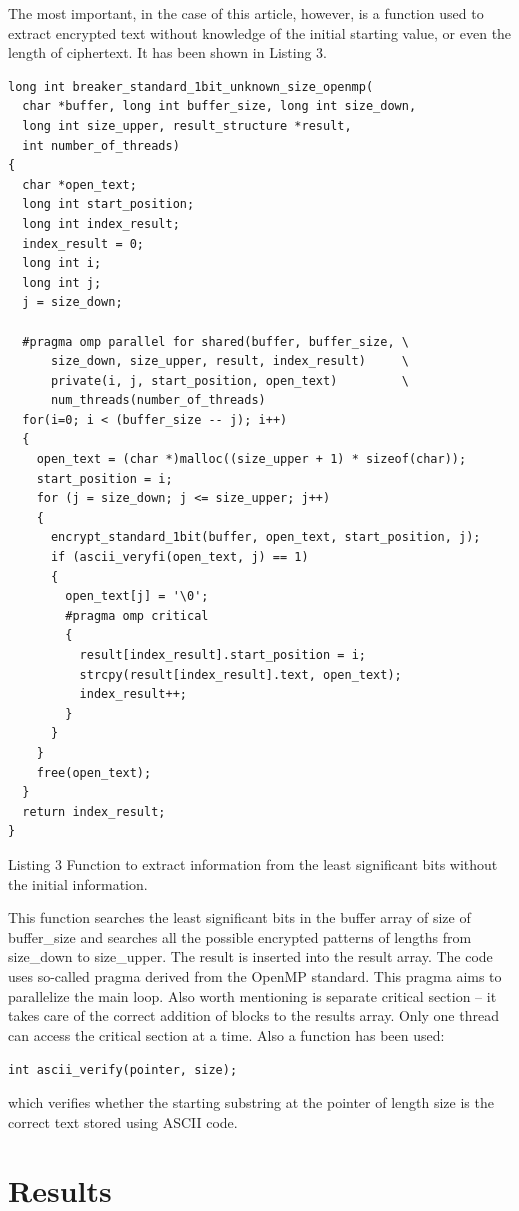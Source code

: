 \documentclass[10pt, a5paper]{article}
\begin{document}
The most important, in the case of this article, however, is a function used to extract encrypted text without knowledge of the initial starting value, or even the length of ciphertext. It has been shown in Listing 3.

\begin{verbatim}
long int breaker_standard_1bit_unknown_size_openmp(
  char *buffer, long int buffer_size, long int size_down,
  long int size_upper, result_structure *result,
  int number_of_threads)
{
  char *open_text;
  long int start_position;
  long int index_result;
  index_result = 0;
  long int i;
  long int j;
  j = size_down;

  #pragma omp parallel for shared(buffer, buffer_size, \
      size_down, size_upper, result, index_result)     \
      private(i, j, start_position, open_text)         \
      num_threads(number_of_threads)
  for(i=0; i < (buffer_size -- j); i++)
  {
    open_text = (char *)malloc((size_upper + 1) * sizeof(char));
    start_position = i;
    for (j = size_down; j <= size_upper; j++)
    {
      encrypt_standard_1bit(buffer, open_text, start_position, j);
      if (ascii_veryfi(open_text, j) == 1)
      {
        open_text[j] = '\0';
        #pragma omp critical
        {
          result[index_result].start_position = i;
          strcpy(result[index_result].text, open_text);
          index_result++;
        }
      }
    }
    free(open_text);
  }
  return index_result;
}
\end{verbatim}

Listing 3 Function to extract information from the least significant bits without the initial information.

This function searches the least significant bits in the buffer array of size of buffer\_size and searches all the possible encrypted patterns of lengths from size\_down to size\_upper. The result is inserted into the result array. The code uses so-called pragma derived from the OpenMP standard. This pragma aims to parallelize the main loop. Also worth mentioning is separate critical section -- it takes care of the correct addition of blocks to the results array. Only one thread can access the critical section at a time. Also a function has been used:

\verb!int ascii_verify(pointer, size);!

which verifies whether the starting substring at the pointer of length size is the correct text stored using ASCII code.

\section{Results}
\end{document}
